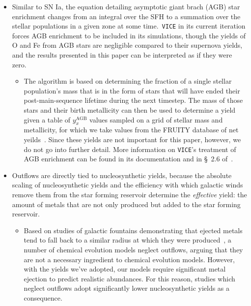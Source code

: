 \documentclass[fleqn, usenatbib]{mnras}
\begin{document}
\begin{itemize}
	\item Similar to SN Ia, the equation detailing asymptotic giant brach 
	(AGB) star enrichment changes from an integral over the SFH to a summation 
	over the stellar populations in a given zone at some time.~\texttt{VICE} 
	in its current iteration forces AGB enrichment to be included in its 
	simulations, though the yields of O and Fe from AGB stars are negligible 
	compared to their supernova yields, and the results presented in this 
	paper can be interpreted as if they were zero. 
	\begin{itemize} 
		\item The algorithm is based on determining the fraction of a single 
		stellar population's mass that is in the form of stars that will have 
		ended their post-main-sequence lifetime during the next timestep. 
		The mass of those stars and their birth metallicity can then be 
		used to determine a yield given a table of $y_x^\text{AGB}$ values 
		sampled on a grid of stellar mass and metallicity, for which we take 
		values from the FRUITY database of net yeilds~\citep{Cristallo2011}. 
		Since these yields are not important for this paper, however, we do 
		not go into further detail. More information on \texttt{VICE}'s 
		treatment of AGB enrichment can be found in its documentation and in 
		\S~2.6 of~\citet{Johnson2020}. 
	\end{itemize} 

	\item Outflows are directly tied to nucleosynthetic yields, because the 
	absolute scaling of nucleosynthetic yields and the efficiency with which 
	galactic winds remove them from the star forming reservoir determine the 
	\textit{effective} yield: the amount of metals that are not only produced 
	but added to the star forming reservoir. 
	\begin{itemize} 
		\item Based on studies of galactic fountains demonstrating that 
		ejected metals tend to fall back to a similar radius at which they 
		were produced~\citep[e.g.][]{Melioli2008, Melioli2009, Spitoni2008, 
		Spitoni2009}, a number of chemical evolution models 
		\citep[e.g.][]{Minchev2013, Spitoni2019} neglect outflows, arguing 
		that they are not a necessary ingredient to chemical evolution models. 
		However, with the yields we've adopted, our models require significant 
		metal ejection to predict realistic abundances. For this reason, 
		studies which neglect outflows adopt significantly lower 
		nucleosynthetic yields as a consequence. 


\end{itemize}
\end{itemize}
\end{document}
